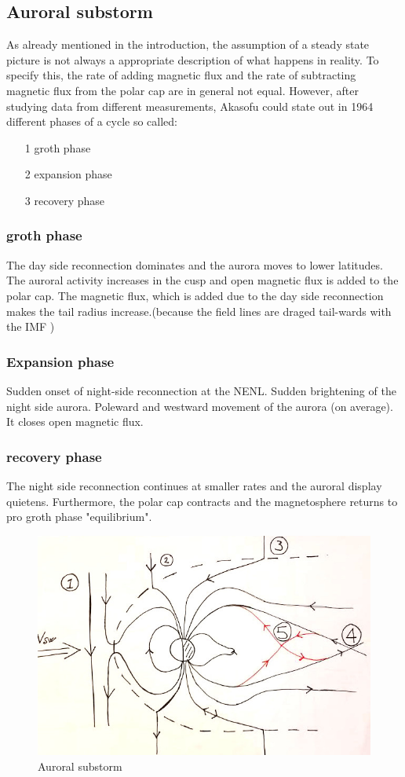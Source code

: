 \documentclass[10pt,a4paper]{article}
\begin{document}
\subsection{Auroral substorm}
As already mentioned in the introduction, the assumption of a steady state picture is not always a appropriate description of what happens in reality. To specify this, the rate of adding magnetic flux and the rate of subtracting magnetic flux from the polar cap are in general not equal. However, after studying data from different measurements, Akasofu could state out in 1964 different phases of a cycle so called:
\begin{itemize}
\item[1] groth phase
\item[2] expansion phase
\item[3] recovery phase
\end{itemize}
\subsubsection{groth phase}
The day side reconnection dominates and the aurora moves to lower latitudes. The auroral activity increases in the cusp and open magnetic flux is added to the polar cap. The magnetic flux, which is added due to the day side reconnection makes the tail radius increase.(because the field lines are draged tail-wards with the IMF )
\subsubsection{Expansion phase}
Sudden onset of night-side reconnection at the NENL. Sudden brightening of the night side aurora. Poleward and westward movement of the aurora (on average). It closes open magnetic flux. 
\subsubsection{recovery phase}
The night side reconnection continues at smaller rates and the auroral display quietens. Furthermore, the polar cap contracts and the magnetosphere returns to pro groth phase "equilibrium". 
\begin{figure}[h]
\centering
\caption{Auroral substorm}
\label{aurora substorm}
\includegraphics[scale=0.5]{solvind2.jpg}
\end{figure}
\end{document}
